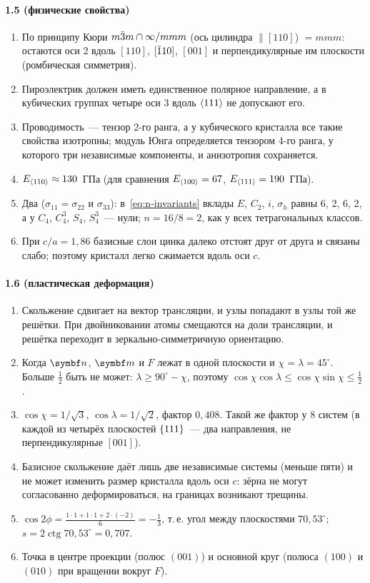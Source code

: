 {\paragraph{1.5 (физические свойства)}
\begin{enumerate}[label=\arabic*.]
\item По принципу Кюри $m\bar{3}m\cap\infty/mmm$ (ось цилиндра $\parallel[110]$)
$=mmm$: остаются оси 2 вдоль $[110]$, $[\bar{1}10]$, $[001]$ и
перпендикулярные им плоскости (ромбическая симметрия).
\item Пироэлектрик должен иметь единственное полярное направление, а в
кубических группах четыре оси 3 вдоль $\langle 111\rangle$ не допускают его.
\item Проводимость~— тензор 2-го ранга, а у кубического кристалла все
такие свойства изотропны; модуль Юнга определяется тензором 4-го ранга,
у которого три независимые компоненты, и анизотропия сохраняется.
\item $E_{\langle 110\rangle}\approx130$~ГПа (для сравнения $E_{\langle 100\rangle}=67$,
$E_{\langle 111\rangle}=190$~ГПа).
\item Два ($\sigma_{11}=\sigma_{22}$ и $\sigma_{33}$): в~\eqref{eq:n-invariants}
вклады $E$, $C_2$, $i$, $\sigma_h$ равны 6, 2, 6, 2, а у $C_4$, $C_4^3$, $S_4$,
$S_4^3$~— нули; $n=16/8=2$, как у всех тетрагональных классов.
\item При $c/a=1{,}86$ базисные слои цинка далеко отстоят друг от друга и
связаны слабо; поэтому кристалл легко сжимается вдоль оси $c$.
\end{enumerate}

\paragraph{1.6 (пластическая деформация)}
\begin{enumerate}[label=\arabic*.]
\item Скольжение сдвигает на вектор трансляции, и узлы попадают в узлы той
же решётки. При двойниковании атомы смещаются на доли трансляции, и
решётка переходит в зеркально-симметричную ориентацию.
\item Когда $\vb n$, $\vb m$ и $F$ лежат в одной плоскости и
$\chi=\lambda=45^\circ$. Больше $\frac12$ быть не может: $\lambda\ge90^\circ-\chi$,
поэтому $\cos\chi\cos\lambda\le\cos\chi\sin\chi\le\frac12$.
\item $\cos\chi=1/\sqrt3$, $\cos\lambda=1/\sqrt2$, фактор $0{,}408$. Такой
же фактор у 8 систем (в каждой из четырёх плоскостей $\{111\}$~— два
направления, не перпендикулярные $[001]$).
\item Базисное скольжение даёт лишь две независимые системы (меньше
пяти) и не может изменить размер кристалла вдоль оси $c$: зёрна не могут
согласованно деформироваться, на границах возникают трещины.
\item $\cos2\phi=\frac{1\cdot1+1\cdot1+2\cdot(-2)}{6}=-\frac13$, т.\,е. угол
между плоскостями $70{,}53^\circ$; $s=2\operatorname{ctg}70{,}53^\circ=0{,}707$.
\item Точка в центре проекции (полюс $(001)$) и основной круг (полюса
$(100)$ и $(010)$ при вращении вокруг $F$).
\end{enumerate}

}

